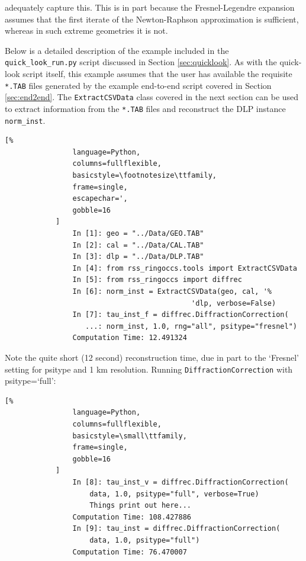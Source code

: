 \documentclass[titlepage, 12pt]{article}
\begin{document}
            adequately capture this. This is in part because the
            Fresnel-Legendre expansion assumes that the first iterate of
            the Newton-Raphson approximation is sufficient, whereas in such
            extreme geometries it is not.
                       \par\hfill\par
            Below is a detailed description of the example 
            included in the \texttt{quick\_look\_run.py} script 
            discussed in Section \ref{sec:quicklook}.
            As with the quick-look
            script itself, this example assumes that
            the user has available the requisite \texttt{*.TAB}
            files generated by the example end-to-end script 
            covered in Section \ref{sec:end2end}.
            The \texttt{ExtractCSVData} 
            class covered in the next section can be used
            to extract information from the \texttt{*.TAB} files and 
            reconstruct the DLP instance \texttt{norm\_inst}.     
            \begin{lstlisting}[%
                language=Python,
                columns=fullflexible,
                basicstyle=\footnotesize\ttfamily,
                frame=single,
                escapechar=',
                gobble=16
            ]
                In [1]: geo = "../Data/GEO.TAB"
                In [2]: cal = "../Data/CAL.TAB"
                In [3]: dlp = "../Data/DLP.TAB"
                In [4]: from rss_ringoccs.tools import ExtractCSVData
                In [5]: from rss_ringoccs import diffrec
                In [6]: norm_inst = ExtractCSVData(geo, cal, '%
                                            'dlp, verbose=False)
                In [7]: tau_inst_f = diffrec.DiffractionCorrection(
                   ...: norm_inst, 1.0, rng="all", psitype="fresnel")
                Computation Time: 12.491324
            \end{lstlisting}
            Note the quite short (12 second) reconstruction time,
            due in part to the
            `Fresnel' setting for psitype and 1 km resolution.
            Running \texttt{DiffractionCorrection}
            with psitype=`full':
            \begin{lstlisting}[%
                language=Python,
                columns=fullflexible,
                basicstyle=\small\ttfamily,
                frame=single,
                gobble=16
            ]
                In [8]: tau_inst_v = diffrec.DiffractionCorrection(
                    data, 1.0, psitype="full", verbose=True)
                    Things print out here...
                Computation Time: 108.427886
                In [9]: tau_inst = diffrec.DiffractionCorrection(
                    data, 1.0, psitype="full")
                Computation Time: 76.470007
            \end{lstlisting}
\end{document}
